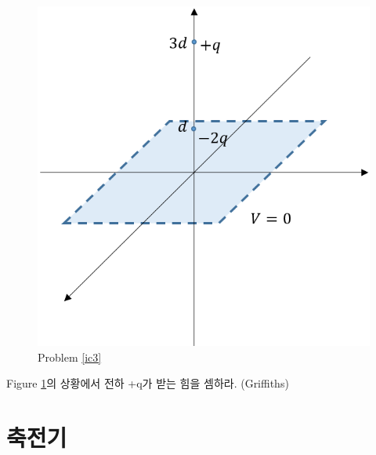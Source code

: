 \begin{problem}\label{ic3}
\begin{figure}[h]
\centering\includegraphics[scale=0.4]{Pictures/image_charge-3.PNG}
\caption{Problem \ref{ic3}}
\label{fig:ic3} %
\end{figure}
Figure \ref{fig:ic3}의 상황에서 전하 +q가 받는 힘을 셈하라. (Griffiths)
\end{problem}

\section{축전기}
